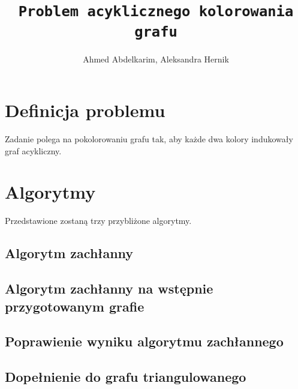 \documentclass{article}
\title{\texttt{Problem acyklicznego kolorowania grafu}}
\author{Ahmed Abdelkarim, Aleksandra Hernik}
\begin{document}
\maketitle
\section{Definicja problemu}
Zadanie polega na pokolorowaniu grafu tak, aby każde dwa kolory indukowały graf acykliczny. 
\section{Algorytmy}
Przedstawione zostaną trzy przybliżone algorytmy.
\subsection{Algorytm zachłanny}

\subsection{Algorytm zachłanny na wstępnie przygotowanym grafie}

\subsection{Poprawienie wyniku algorytmu zachłannego}

\subsection{Dopełnienie do grafu triangulowanego}
\end{document}
